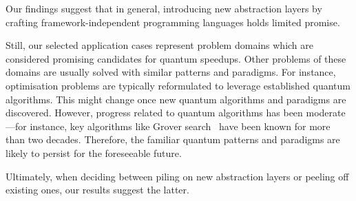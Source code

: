 \documentclass[conference]{IEEEtran}
\begin{document}
Our findings suggest that in general, introducing new abstraction layers by crafting framework-independent
programming languages holds limited promise.

Still, our selected application cases represent problem domains which are considered promising candidates for
quantum speedups. Other problems of these domains are usually solved with similar patterns and paradigms. For instance,
optimisation problems are typically reformulated to leverage established quantum algorithms. This might change once
new quantum algorithms and paradigms are discovered. However, progress related to quantum algorithms has been
moderate---for instance, key algorithms like Grover search~\cite{Grover.1996} have been known for more than two
decades. Therefore, the familiar quantum patterns and paradigms are likely to persist for the foreseeable future. 

Ultimately, when deciding between piling on new abstraction layers or peeling off existing ones,
our results suggest the latter.

\printbibliography
\end{document}
